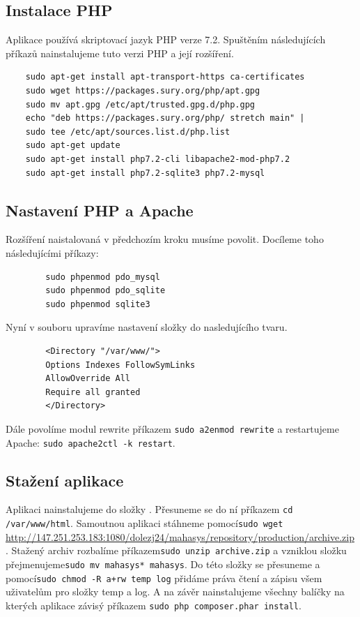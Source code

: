 \documentclass[thesis=B,czech]{FITthesis}[2012/06/26]
\begin{document}
\subsection{Instalace PHP}
	Aplikace používá skriptovací jazyk PHP verze 7.2. Spuštěním následujících příkazů nainstalujeme tuto verzi PHP a její rozšíření.
	\begin{verbatim}
	sudo apt-get install apt-transport-https ca-certificates
	sudo wget https://packages.sury.org/php/apt.gpg
	sudo mv apt.gpg /etc/apt/trusted.gpg.d/php.gpg 
	echo "deb https://packages.sury.org/php/ stretch main" | 
	sudo tee /etc/apt/sources.list.d/php.list
	sudo apt-get update
	sudo apt-get install php7.2-cli libapache2-mod-php7.2
	sudo apt-get install php7.2-sqlite3 php7.2-mysql
	\end{verbatim}
\subsection{Nastavení PHP a Apache}
	Rozšíření naistalovaná v předchozím kroku musíme povolit. Docíleme toho následujícími příkazy:
	\begin{verbatim}
		sudo phpenmod pdo_mysql
		sudo phpenmod pdo_sqlite
		sudo phpenmod sqlite3
	\end{verbatim}
	Nyní v souboru  upravíme nastavení složky\newline{} do nasledujícího tvaru.
	\begin{verbatim}
		<Directory "/var/www/">
		Options Indexes FollowSymLinks
		AllowOverride All
		Require all granted
		</Directory>
	\end{verbatim}
	Dále povolíme modul rewrite příkazem \verb|sudo a2enmod rewrite| a restartujeme Apache: \verb|sudo apache2ctl -k restart|.
\subsection{Stažení aplikace}
	Aplikaci nainstalujeme do složky . Přesuneme se do ní příkazem \verb|cd /var/www/html|. Samoutnou aplikaci stáhneme pomocí\newline\verb|sudo wget | \url{http://147.251.253.183:1080/dolezj24/mahasys/repository/production/archive.zip}. Stažený archiv rozbalíme příkazem\newline\verb|sudo unzip archive.zip| a vzniklou složku přejmenujeme\newline\verb|sudo mv mahasys* mahasys|. Do této složky se přesuneme a pomocí\newline\verb|sudo chmod -R a+rw temp log| přidáme práva čtení a zápisu všem uživatelům pro složky temp a log. A na závěr nainstalujeme všechny balíčky na kterých aplikace závisý příkazem \verb|sudo php composer.phar install|.
\end{document}
